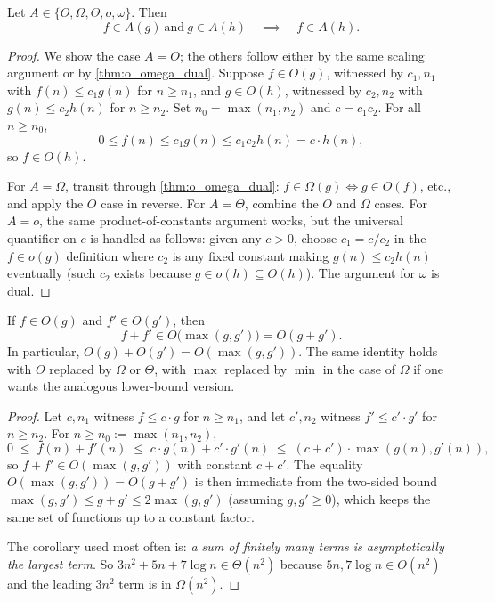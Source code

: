 \begin{theorem}[Transitivity]
\label{thm:asymp_transitive}
Let $A \in \{O, \Omega, \Theta, o, \omega\}$. Then
\[
  f \in A(g) \ \text{and}\ g \in A(h) \quad\implies\quad f \in A(h).
\]
\end{theorem}

\begin{proof}
We show the case $A = O$; the others follow either by the same scaling argument or by \cref{thm:o_omega_dual}. Suppose $f \in O(g)$, witnessed by $c_1, n_1$ with $f(n) \le c_1 g(n)$ for $n \ge n_1$, and $g \in O(h)$, witnessed by $c_2, n_2$ with $g(n) \le c_2 h(n)$ for $n \ge n_2$. Set $n_0 = \max(n_1, n_2)$ and $c = c_1 c_2$. For all $n \ge n_0$,
\[
  0 \le f(n) \le c_1 g(n) \le c_1 c_2 h(n) = c \cdot h(n),
\]
so $f \in O(h)$.

For $A = \Omega$, transit through \cref{thm:o_omega_dual}: $f \in \Omega(g) \iff g \in O(f)$, etc., and apply the $O$ case in reverse. For $A = \Theta$, combine the $O$ and $\Omega$ cases. For $A = o$, the same product-of-constants argument works, but the universal quantifier on $c$ is handled as follows: given any $c > 0$, choose $c_1 = c/c_2$ in the $f \in o(g)$ definition where $c_2$ is any fixed constant making $g(n) \le c_2 h(n)$ eventually (such $c_2$ exists because $g \in o(h) \subseteq O(h)$). The argument for $\omega$ is dual.
\end{proof}

\begin{theorem}
\label{thm:asymp_sum}
If $f \in O(g)$ and $f' \in O(g')$, then
\[
  f + f' \in O\bigl(\max(g, g')\bigr) = O(g + g').
\]
In particular, $O(g) + O(g') = O(\max(g, g'))$. The same identity holds with $O$ replaced by $\Omega$ or $\Theta$, with $\max$ replaced by $\min$ in the case of $\Omega$ if one wants the analogous lower-bound version.
\end{theorem}

\begin{proof}
Let $c, n_1$ witness $f \le c \cdot g$ for $n \ge n_1$, and let $c', n_2$ witness $f' \le c' \cdot g'$ for $n \ge n_2$. For $n \ge n_0 := \max(n_1, n_2)$,
\[
  0 \;\le\; f(n) + f'(n) \;\le\; c \cdot g(n) + c' \cdot g'(n)
  \;\le\; (c + c') \cdot \max(g(n), g'(n)),
\]
so $f + f' \in O(\max(g, g'))$ with constant $c + c'$. The equality $O(\max(g, g')) = O(g + g')$ is then immediate from the two-sided bound $\max(g, g') \le g + g' \le 2 \max(g, g')$ (assuming $g, g' \ge 0$), which keeps the same set of functions up to a constant factor.

The corollary used most often is: \emph{a sum of finitely many terms is asymptotically the largest term}. So $3n^2 + 5n + 7 \log n \in \Theta(n^2)$ because $5n, 7 \log n \in O(n^2)$ and the leading $3n^2$ term is in $\Omega(n^2)$.
\end{proof}

